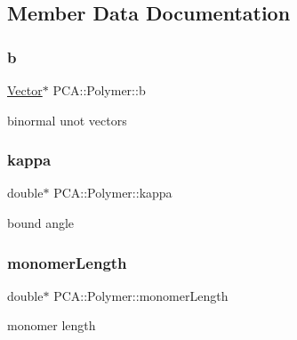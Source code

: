 \subsection{Member Data Documentation}
\hypertarget{class_p_c_a_1_1_polymer_ad93199b0187ab557476153b204b921c7}{}\label{class_p_c_a_1_1_polymer_ad93199b0187ab557476153b204b921c7} 
\subsubsection{\texorpdfstring{b}{b}}
{\footnotesize\ttfamily \hyperlink{class_p_c_a_1_1_vector}{Vector}$\ast$ P\+C\+A\+::\+Polymer\+::b\hspace{0.3cm}{\ttfamily [protected]}}



binormal unot vectors 

\hypertarget{class_p_c_a_1_1_polymer_a1bef29f1613bb4b67981aae7df3d804b}{}\label{class_p_c_a_1_1_polymer_a1bef29f1613bb4b67981aae7df3d804b} 
\subsubsection{\texorpdfstring{kappa}{kappa}}
{\footnotesize\ttfamily double$\ast$ P\+C\+A\+::\+Polymer\+::kappa\hspace{0.3cm}{\ttfamily [protected]}}



bound angle 

\hypertarget{class_p_c_a_1_1_polymer_adec33c5274834c85479abefe537efa5a}{}\label{class_p_c_a_1_1_polymer_adec33c5274834c85479abefe537efa5a} 
\subsubsection{\texorpdfstring{monomer\+Length}{monomerLength}}
{\footnotesize\ttfamily double$\ast$ P\+C\+A\+::\+Polymer\+::monomer\+Length\hspace{0.3cm}{\ttfamily [protected]}}



monomer length 

\hypertarget{class_p_c_a_1_1_polymer_a7c71d8f5516ae0b0ead3929296135d1b}{}\label{class_p_c_a_1_1_polymer_a7c71d8f5516ae0b0ead3929296135d1b} 

